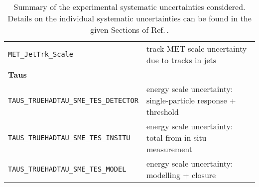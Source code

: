 \begin{table}
{\begin{tabular}{ll}
  \texttt{MET\_JetTrk\_Scale} & track MET scale uncertainty due to tracks in jets \\%
  {\bfseries Taus}&\\
  \texttt{TAUS\_TRUEHADTAU\_SME\_TES\_DETECTOR} & energy scale uncertainty: single-particle response + threshold \\%
  \texttt{TAUS\_TRUEHADTAU\_SME\_TES\_INSITU} & energy scale uncertainty: total from in-situ measurement \\%
  \texttt{TAUS\_TRUEHADTAU\_SME\_TES\_MODEL} & energy scale uncertainty: modelling + closure \\%
  \bottomrule
\end{tabular}
}
\caption{Summary of the experimental systematic uncertainties considered.
  Details on the individual systematic uncertainties can be found in the given
  Sections of Ref.\,\cite{VHobjectsupportnote}.}
\label{tab:expSyst}
\end{table}